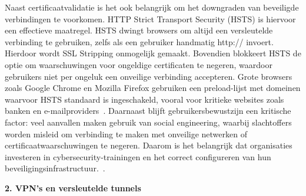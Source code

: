 Naast certificaatvalidatie is het ook belangrijk om het downgraden van beveiligde verbindingen te voorkomen. HTTP Strict Transport Security (HSTS) is hiervoor een effectieve maatregel. HSTS dwingt browsers om altijd een versleutelde verbinding te gebruiken, zelfs als een gebruiker handmatig http:// invoert. Hierdoor wordt SSL Stripping onmogelijk gemaakt. Bovendien blokkeert HSTS de optie om waarschuwingen voor ongeldige certificaten te negeren, waardoor gebruikers niet per ongeluk een onveilige verbinding accepteren. Grote browsers zoals Google Chrome en Mozilla Firefox gebruiken een preload-lijst met domeinen waarvoor HSTS standaard is ingeschakeld, vooral voor kritieke websites zoals banken en e-mailproviders~\autocite{ciohsts}.
Daarnaast blijft gebruikersbewustzijn een kritische factor: veel aanvallen maken gebruik van social engineering, waarbij slachtoffers worden misleid om verbinding te maken met onveilige netwerken of certificaatwaarschuwingen te negeren. Daarom is het belangrijk dat organisaties investeren in cybersecurity-trainingen en het correct configureren van hun beveiligingsinfrastructuur.~\autocite{cybercompanysocialengineering}.

\vspace{0.5cm}
\textbf{2. VPN’s en versleutelde tunnels}
\vspace{0.5cm}


